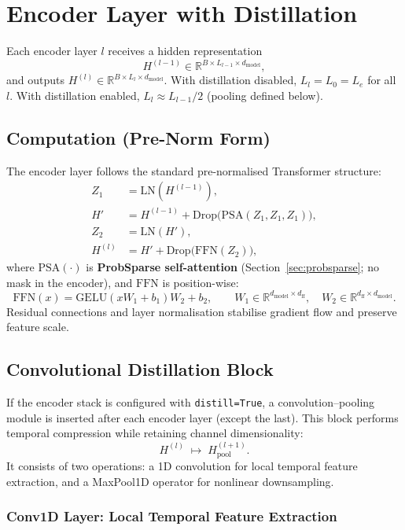 \documentclass[11pt]{article}
\begin{document}
\section{Encoder Layer with Distillation}
\label{sec:encoder-distill}

Each encoder layer $l$ receives a hidden representation
\[
H^{(l-1)} \in \mathbb{R}^{B \times L_{l-1} \times d_{\text{model}}},
\]
and outputs $H^{(l)} \in \mathbb{R}^{B \times L_{l} \times d_{\text{model}}}$.
With distillation disabled, $L_l=L_0=L_e$ for all $l$.
With distillation enabled, $L_l \approx L_{l-1}/2$ (pooling defined below).

\subsection{Computation (Pre-Norm Form)}

The encoder layer follows the standard pre-normalised Transformer structure:
\begin{align}
Z_1 &= \mathrm{LN}(H^{(l-1)}), \\
H' &= H^{(l-1)} + \mathrm{Drop}\!\big(\mathrm{PSA}(Z_1, Z_1, Z_1)\big), \\
Z_2 &= \mathrm{LN}(H'), \\
H^{(l)} &= H' + \mathrm{Drop}\!\big(\mathrm{FFN}(Z_2)\big),
\end{align}
where $\mathrm{PSA}(\cdot)$ is \textbf{ProbSparse self-attention} (Section~\ref{sec:probsparse}; no mask in the encoder), and $\mathrm{FFN}$ is position-wise:
\[
\mathrm{FFN}(x) = \mathrm{GELU}(xW_1 + b_1)W_2 + b_2,
\qquad
W_1 \in \mathbb{R}^{d_{\text{model}} \times d_{\text{ff}}},
\quad
W_2 \in \mathbb{R}^{d_{\text{ff}} \times d_{\text{model}}}.
\]
Residual connections and layer normalisation stabilise gradient flow and preserve feature scale.

\subsection{Convolutional Distillation Block}

If the encoder stack is configured with \texttt{distill=True},
a convolution--pooling module is inserted after each encoder layer (except the last).
This block performs temporal compression while retaining channel dimensionality:
\[
H^{(l)} \;\longmapsto\; H^{(l+1)}_{\text{pool}}.
\]
It consists of two operations:
a 1D convolution for local temporal feature extraction,
and a MaxPool1D operator for nonlinear downsampling.

\subsubsection{Conv1D Layer: Local Temporal Feature Extraction}
\end{document}
